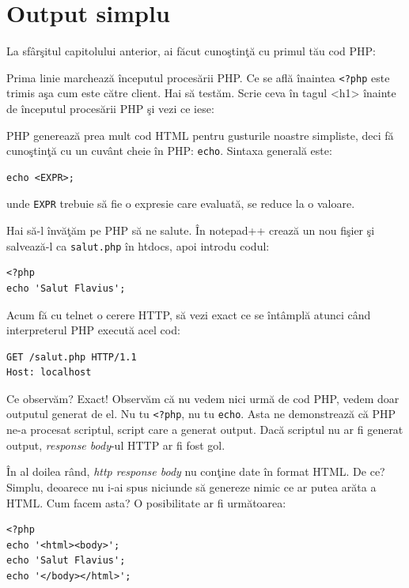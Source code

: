 \section{Output simplu}
\label{sec:output simplu}
La sfârşitul capitolului anterior, ai făcut cunoştinţă
cu primul tău cod PHP:


Prima linie marchează începutul procesării PHP. Ce se află
înaintea \texttt{<?php} este trimis aşa cum este către client.
Hai să testăm. Scrie ceva în tagul <h1> înainte de începutul
procesării PHP şi vezi ce iese:


PHP generează prea mult cod HTML pentru gusturile noastre simpliste, deci
fă cunoştinţă cu un cuvânt cheie în PHP: \texttt{echo}. Sintaxa
generală este:
\begin{verbatim}
echo <EXPR>;
\end{verbatim}
unde \texttt{EXPR}  trebuie să fie o expresie care evaluată, se reduce la o valoare.


Hai să-l învăţăm pe PHP să ne salute. În notepad++ crează un nou fişier
şi salvează-l ca \texttt{salut.php} în htdocs, apoi introdu codul:
\begin{lstlisting}
<?php
echo 'Salut Flavius';
\end{lstlisting}
Acum fă cu telnet o cerere HTTP, să vezi exact ce se întâmplă atunci când
interpreterul PHP execută acel cod:
\begin{verbatim}
GET /salut.php HTTP/1.1
Host: localhost
\end{verbatim}

Ce observăm? Exact! Observăm că nu vedem nici urmă de cod PHP, vedem doar
outputul generat de el. Nu tu \texttt{<?php}, nu tu \texttt{echo}. Asta
ne demonstrează că PHP ne-a procesat scriptul, script care a generat
output. Dacă scriptul nu ar fi generat output, \textit{response body}-ul
HTTP ar fi fost gol.

În al doilea rând, \textsl{http response body} nu conţine date în format HTML.
De ce? Simplu, deoarece nu i-ai spus niciunde să genereze nimic ce ar putea arăta a
HTML. Cum facem asta? O posibilitate ar fi următoarea:
\begin{lstlisting}
<?php
echo '<html><body>';
echo 'Salut Flavius';
echo '</body></html>';
\end{lstlisting}

